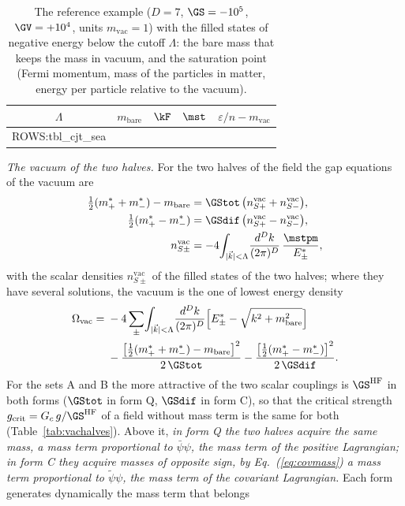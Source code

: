 \begin{table}
\caption{\label{tab:cjtsea}The reference example ($D=7$, $\GS=-10^{5}$, $\GV=+10^{4}$, units
$m_{\mathrm{vac}}=1$) with the filled states of negative energy below the cutoff $\Lambda$: the bare
mass that keeps the mass in vacuum, and the saturation point (Fermi momentum, mass of the particles
in matter, energy per particle relative to the vacuum).}
\begin{ruledtabular}
\begin{tabular}{ccccc}
$\Lambda$ & $m_{\mathrm{bare}}$ & $\kF$ & $\mst$ & $\varepsilon/n-m_{\mathrm{vac}}$ \\
\hline
{{ROWS:tbl_cjt_sea}}
\end{tabular}
\end{ruledtabular}
\end{table}
\emph{The vacuum of the two halves.} For the two halves of the field the gap equations of the
vacuum are
\begin{equation}
\begin{aligned}
\tfrac12(m^{*}_++m^{*}_-)-m_{\mathrm{bare}}&=\GStot\,\big(n_{S+}^{\mathrm{vac}}+n_{S-}^{\mathrm{vac}}\big),\\
\tfrac12(m^{*}_+-m^{*}_-)&=\GSdif\,\big(n_{S+}^{\mathrm{vac}}-n_{S-}^{\mathrm{vac}}\big),\\
n_{S\pm}^{\mathrm{vac}}&=-4\!\int_{|\vec k|<\Lambda}\!\frac{d^{D}k}{(2\pi)^{D}}\,\frac{\mstpm}{E^{*}_\pm},
\end{aligned}
\label{eq:vachalves}
\end{equation}
with the scalar densities $n_{S\pm}^{\mathrm{vac}}$ of the filled states of the two halves; where they
have several solutions, the vacuum is the one of lowest energy density
\begin{equation}
\begin{aligned}
\Omega_{\mathrm{vac}}={}&-4\sum_\pm\!\int_{|\vec k|<\Lambda}\!\frac{d^{D}k}{(2\pi)^{D}}\Big[E^{*}_\pm-\sqrt{k^{2}+m_{\mathrm{bare}}^{2}}\Big]\\
&-\frac{\big[\tfrac12(m^{*}_++m^{*}_-)-m_{\mathrm{bare}}\big]^{2}}{2\,\GStot}-\frac{\big[\tfrac12(m^{*}_+-m^{*}_-)\big]^{2}}{2\,\GSdif} .
\end{aligned}
\end{equation}
For the sets A and B the more attractive of the two scalar couplings is $\GS^{\mathrm{HF}}$ in both
forms ($\GStot$ in form Q, $\GSdif$ in form C), so that the critical strength
$g_{\mathrm{crit}}=G_c\,g/\GS^{\mathrm{HF}}$ of a field without mass term is the same for both
(Table~\ref{tab:vachalves}). Above it, \emph{in form Q the two halves acquire the same mass, a mass
term proportional to $\bar\psi\psi$, the mass term of the positive Lagrangian; in form C they acquire
masses of opposite sign, by Eq.~(\ref{eq:covmass}) a mass term proportional to $\tilde\psi\psi$, the
mass term of the covariant Lagrangian.} Each form generates dynamically the mass term that belongs
